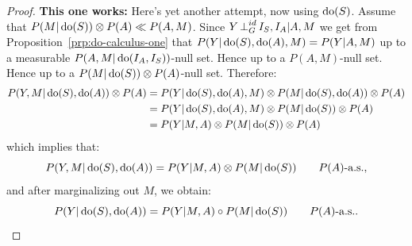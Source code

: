 \begin{proof}
\textbf{This one works:}
Here's yet another attempt, now using $\operatorname{do}(S)$. Assume that $P(M|\operatorname{do}(S)) \otimes P(A) \ll P(A,M)$.
Since $Y \operatorname*{\perp}^{id}_G I_S,I_A | A,M$ we get from Proposition~\ref{prp:do-calculus-one} that $P(Y|\operatorname{do}(S),\operatorname{do}(A),M) = P(Y|A,M)$ up to a measurable $P(A,M|\operatorname{do}(I_A,I_S))$-null set.
Hence up to a $P(A,M)$-null set. Hence up to a $P(M|\operatorname{do}(S)) \otimes P(A)$-null set.
Therefore:
\begin{equation*}\begin{split}
    P(Y,M|\operatorname{do}(S),\operatorname{do}(A)) \otimes P(A)
 &= P(Y|\operatorname{do}(S),\operatorname{do}(A),M) \otimes P(M|\operatorname{do}(S),\operatorname{do}(A)) \otimes P(A) \\
 &= P(Y|\operatorname{do}(S),\operatorname{do}(A),M) \otimes P(M|\operatorname{do}(S)) \otimes P(A) \\
 &= P(Y | M,A) \otimes P(M|\operatorname{do}(S)) \otimes P(A)
\end{split}\end{equation*}
which implies that:
\begin{equation*}
  P(Y,M|\operatorname{do}(S),\operatorname{do}(A)) = P(Y | M,A) \otimes P(M|\operatorname{do}(S)) \qquad P(A)\text{-a.s.},
\end{equation*}
and after marginalizing out $M$, we obtain:
\begin{equation*}
  P(Y|\operatorname{do}(S),\operatorname{do}(A)) = P(Y | M,A) \circ P(M|\operatorname{do}(S)) \qquad P(A)\text{-a.s.}.
\end{equation*}


\end{proof}
